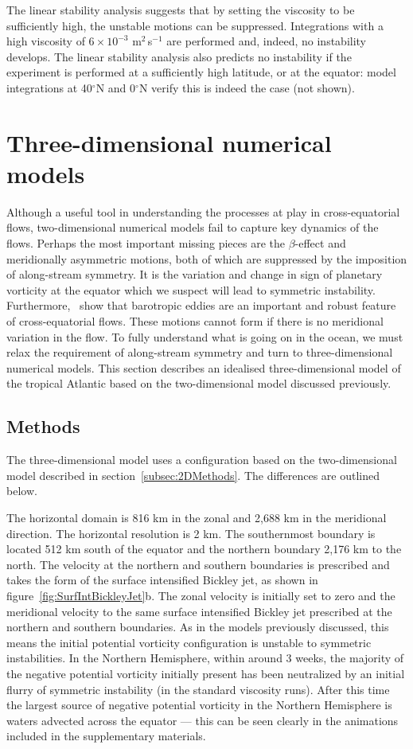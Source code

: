 The linear stability analysis suggests that by setting the viscosity to be sufficiently high, the unstable motions can be suppressed. Integrations with a high viscosity of $6 \times 10^{-3}$ m$^2$\,s$^{-1}$ are performed and, indeed, no instability develops. The linear stability analysis also predicts no instability if the experiment is performed at a sufficiently high latitude, or at the equator: model integrations at 40$^{\circ}$N and 0$^{\circ}$N verify this is indeed the case (not shown).

\section{Three-dimensional numerical models}
Although a useful tool in understanding the processes at play in cross-equatorial flows, two-dimensional numerical models fail to capture key dynamics of the flows. Perhaps the most important missing pieces are the $\beta$-effect and meridionally asymmetric motions, both of which are suppressed by the imposition of along-stream symmetry. It is the variation and change in sign of planetary vorticity at the equator which we suspect will lead to symmetric instability. Furthermore,~\citet{Edwards1998II} show that barotropic eddies are an important and robust feature of cross-equatorial flows. These motions cannot form if there is no meridional variation in the flow. To fully understand what is going on in the ocean, we must relax the requirement of along-stream symmetry and turn to three-dimensional numerical models. This section describes an idealised three-dimensional model of the tropical Atlantic based on the two-dimensional model discussed previously.

\subsection{Methods}
The three-dimensional model uses a configuration based on the two-dimensional model described in section~\ref{subsec:2DMethods}. The differences are outlined below.

The horizontal domain is 816 km in the zonal and 2,688 km in the meridional direction. The horizontal resolution is 2 km. The southernmost boundary is located 512 km south of the equator and the northern boundary 2,176 km to the north. The velocity at the northern and southern boundaries is prescribed and takes the form of the surface intensified Bickley jet, as shown in figure~\ref{fig:SurfIntBickleyJet}b. The zonal velocity is initially set to zero and the meridional velocity to the same  surface intensified Bickley jet prescribed at the northern and southern boundaries. As in the models previously discussed, this means the initial potential vorticity configuration is unstable to symmetric instabilities. In the Northern Hemisphere, within around 3 weeks, the majority of the negative potential vorticity initially present has been neutralized by an initial flurry of symmetric instability (in the standard viscosity runs). After this time the largest source of negative potential vorticity in the Northern Hemisphere is waters advected across the equator --- this can be seen clearly in the animations included in the supplementary materials.

